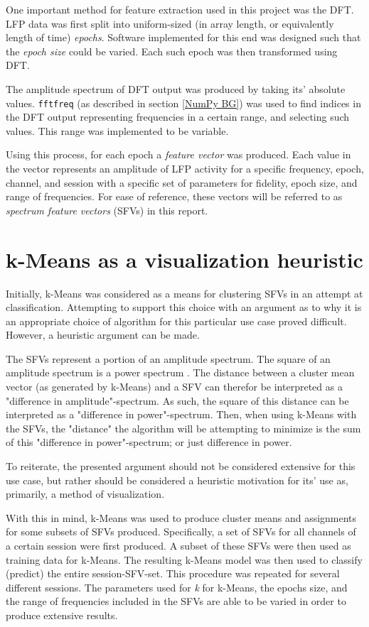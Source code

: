 \documentclass{kththesis}
\begin{document}
One important method for feature extraction used in this project was the DFT. 
LFP data was first split into uniform-sized (in array length, or equivalently length of time) \textit{epochs}.
Software implemented for this end was designed such that the \textit{epoch size} could be varied.
Each such epoch was then transformed using DFT.

The amplitude spectrum of DFT output was produced by taking its' absolute values. 
\texttt{fftfreq} (as described in section \ref{NumPy BG}) was used to find indices in the DFT output representing frequencies in a certain range, and selecting such values.
This range was implemented to be variable.

Using this process, for each epoch a \textit{feature vector} was produced. 
Each value in the vector represents an amplitude of LFP activity for a specific frequency, epoch, channel, and session with a specific set of parameters for fidelity, epoch size, and range of frequencies.
For ease of reference, these vectors will be referred to as \textit{spectrum feature vectors} (SFVs) in this report.

\section{k-Means as a visualization heuristic}\label{KM Method}

Initially, k-Means was considered as a means for clustering SFVs in an attempt at classification. 
Attempting to support this choice with an argument as to why it is an appropriate choice of algorithm for this particular use case proved difficult.
However, a heuristic argument can be made.

The SFVs represent a portion of an amplitude spectrum. 
The square of an amplitude spectrum is a power spectrum \parencite{numpy}.
The distance between a cluster mean vector (as generated by k-Means) and a SFV can therefor be interpreted as a "difference in amplitude"-spectrum.
As such, the square of this distance can be interpreted as a "difference in power"-spectrum.
Then, when using k-Means with the SFVs, the "distance" the algorithm will be attempting to minimize is the sum of this "difference in power"-spectrum; or just difference in power.

To reiterate, the presented argument should not be considered extensive for this use case, but rather should be considered a heuristic motivation for its' use as, primarily, a method of visualization.

With this in mind, k-Means was used to produce cluster means and assignments for some subsets of SFVs produced.
Specifically, a set of SFVs for all channels of a certain session were first produced.
A subset of these SFVs were then used as training data for k-Means.
The resulting k-Means model was then used to classify (predict) the entire session-SFV-set.
This procedure was repeated for several different sessions.
The parameters used for \textit{k} for k-Means, the epochs size, and the range of frequencies included in the SFVs are able to be varied in order to produce extensive results. 
\end{document}
